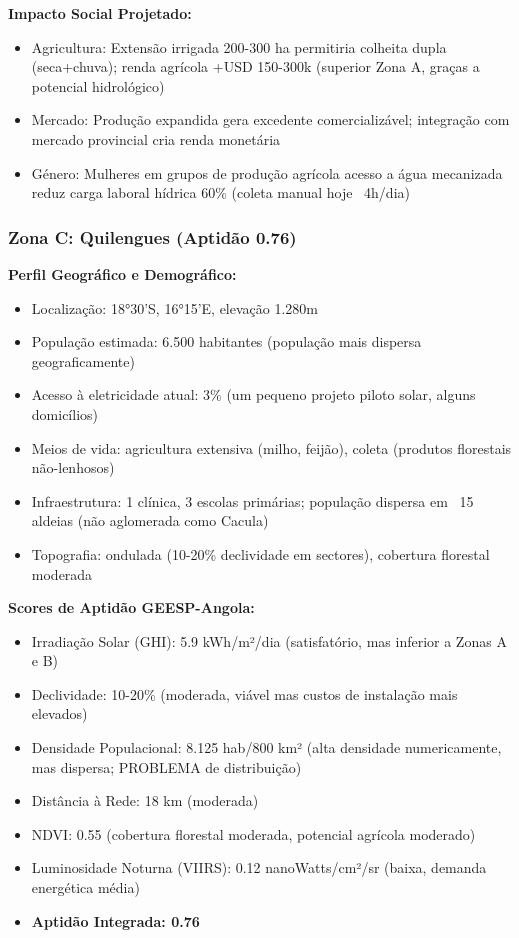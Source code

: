 \documentclass[12pt, a4paper]{article}
\begin{document}
\textbf{Impacto Social Projetado:}
\begin{itemize}
\item Agricultura: Extensão irrigada 200-300 ha permitiria colheita dupla (seca+chuva); renda agrícola +USD 150-300k (superior Zona A, graças a potencial hidrológico)
\item Mercado: Produção expandida gera excedente comercializável; integração com mercado provincial cria renda monetária
\item Género: Mulheres em grupos de produção agrícola acesso a água mecanizada reduz carga laboral hídrica 60\% (coleta manual hoje ~4h/dia)
\end{itemize}

\subsubsection{Zona C: Quilengues (Aptidão 0.76)}

\textbf{Perfil Geográfico e Demográfico:}
\begin{itemize}
\item Localização: 18°30'S, 16°15'E, elevação 1.280m
\item População estimada: 6.500 habitantes (população mais dispersa geograficamente)
\item Acesso à eletricidade atual: 3\% (um pequeno projeto piloto solar, alguns domicílios)
\item Meios de vida: agricultura extensiva (milho, feijão), coleta (produtos florestais não-lenhosos)
\item Infraestrutura: 1 clínica, 3 escolas primárias; população dispersa em ~15 aldeias (não aglomerada como Cacula)
\item Topografia: ondulada (10-20\% declividade em sectores), cobertura florestal moderada
\end{itemize}

\textbf{Scores de Aptidão GEESP-Angola:}
\begin{itemize}
\item Irradiação Solar (GHI): 5.9 kWh/m²/dia (satisfatório, mas inferior a Zonas A e B)
\item Declividade: 10-20\% (moderada, viável mas custos de instalação mais elevados)
\item Densidade Populacional: 8.125 hab/800 km² (alta densidade numericamente, mas dispersa; PROBLEMA de distribuição)
\item Distância à Rede: 18 km (moderada)
\item NDVI: 0.55 (cobertura florestal moderada, potencial agrícola moderado)
\item Luminosidade Noturna (VIIRS): 0.12 nanoWatts/cm²/sr (baixa, demanda energética média)
\item \textbf{Aptidão Integrada: 0.76}
\end{itemize}
\end{document}
